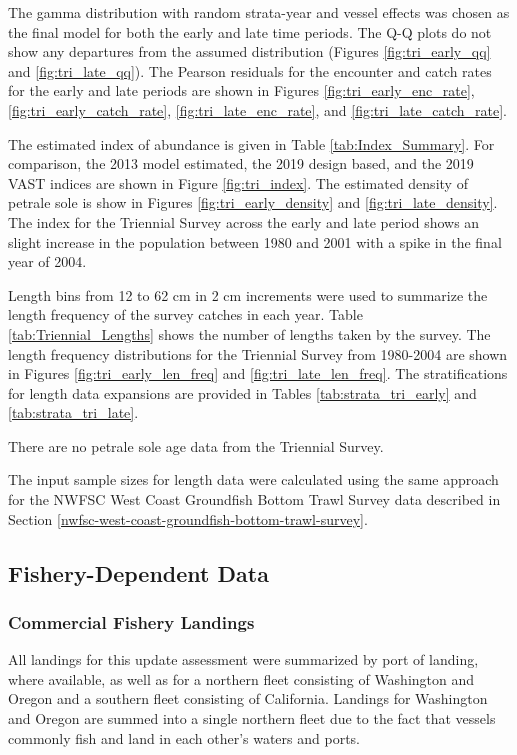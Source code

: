 \documentclass[12pt,]{article}
\begin{document}
The gamma distribution with random strata-year and vessel effects was
chosen as the final model for both the early and late time periods. The
Q-Q plots do not show any departures from the assumed distribution
(Figures \ref{fig:tri_early_qq} and \ref{fig:tri_late_qq}). The Pearson
residuals for the encounter and catch rates for the early and late
periods are shown in Figures \ref{fig:tri_early_enc_rate},
\ref{fig:tri_early_catch_rate}, \ref{fig:tri_late_enc_rate}, and
\ref{fig:tri_late_catch_rate}.

The estimated index of abundance is given in Table
\ref{tab:Index_Summary}. For comparison, the 2013 model estimated, the
2019 design based, and the 2019 VAST indices are shown in Figure
\ref{fig:tri_index}. The estimated density of petrale sole is show in
Figures \ref{fig:tri_early_density} and \ref{fig:tri_late_density}. The
index for the Triennial Survey across the early and late period shows an
slight increase in the population between 1980 and 2001 with a spike in
the final year of 2004.

Length bins from 12 to 62 cm in 2 cm increments were used to summarize
the length frequency of the survey catches in each year. Table
\ref{tab:Triennial_Lengths} shows the number of lengths taken by the
survey. The length frequency distributions for the Triennial Survey from
1980-2004 are shown in Figures \ref{fig:tri_early_len_freq} and
\ref{fig:tri_late_len_freq}. The stratifications for length data
expansions are provided in Tables \ref{tab:strata_tri_early} and
\ref{tab:strata_tri_late}.

There are no petrale sole age data from the Triennial Survey.

The input sample sizes for length data were calculated using the same
approach for the NWFSC West Coast Groundfish Bottom Trawl Survey data
described in Section
\ref{nwfsc-west-coast-groundfish-bottom-trawl-survey}.

\subsection{Fishery-Dependent Data}\label{fishery-dependent-data}

\subsubsection{Commercial Fishery
Landings}\label{commercial-fishery-landings}

All landings for this update assessment were summarized by port of
landing, where available, as well as for a northern fleet consisting of
Washington and Oregon and a southern fleet consisting of California.
Landings for Washington and Oregon are summed into a single northern
fleet due to the fact that vessels commonly fish and land in each
other's waters and ports.
\end{document}
